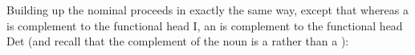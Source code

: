 \documentclass{article}
\begin{document}
Building up the nominal proceeds in exactly the same way, except that whereas a  is complement to the functional head I, an  is complement to the functional head D\lbrack{}et\rbrack{} (and recall that the complement of the noun is a  rather than a ):
\begin{exe}
\end{exe}
\end{document}
